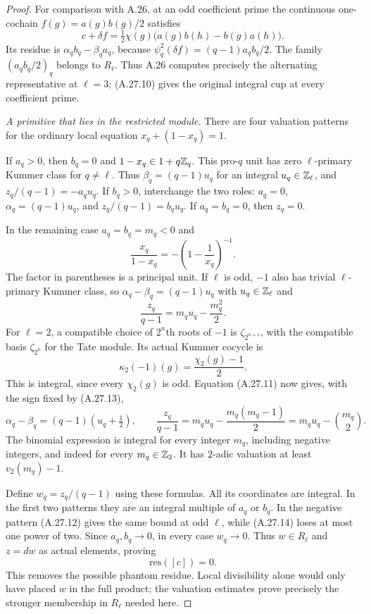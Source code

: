 \begin{proof}
For comparison with A.26, at an odd coefficient prime the
continuous one-cochain $f(g)=a(g)b(g)/2$ satisfies
\[
 c+\delta f
   =\tfrac12\chi(g)\bigl(a(g)b(h)-b(g)a(h)\bigr).
\]
Its residue is $\alpha_qb_q-\beta_qa_q$, because
$\psi_q^2(\delta f)=(q-1)a_qb_q/2$.
The family $(a_qb_q/2)_q$ belongs to $R_\ell$.
Thus A.26 computes precisely the alternating representative
at $\ell=3$; (A.27.10) gives the original integral cup at
every coefficient prime.

\emph{A primitive that lies in the restricted module.}
There are four valuation patterns for the ordinary local
equation $x_q+(1-x_q)=1$.

If $a_q>0$, then $b_q=0$ and $1-x_q\in1+q\mathbb Z_q$.
This pro-$q$ unit has zero $\ell$-primary Kummer class for
$q\ne\ell$. Thus $\beta_q=(q-1)u_q$ for an integral
$u_q\in\mathbb Z_\ell$, and
$z_q/(q-1)=-a_qu_q$.
If $b_q>0$, interchange the two roles: $a_q=0$,
$\alpha_q=(q-1)u_q$, and $z_q/(q-1)=b_qu_q$.
If $a_q=b_q=0$, then $z_q=0$.

In the remaining case $a_q=b_q=m_q<0$ and
\[
 \frac{x_q}{1-x_q}=-\left(1-\frac1{x_q}\right)^{-1}.
 \tag{A.27.11}
\]
The factor in parentheses is a principal unit. If $\ell$ is
odd, $-1$ also has trivial $\ell$-primary Kummer class, so
$\alpha_q-\beta_q=(q-1)u_q$ with $u_q\in\mathbb Z_\ell$ and
\[
 \frac{z_q}{q-1}=m_qu_q-\frac{m_q^2}{2}.
 \tag{A.27.12}
\]
For $\ell=2$, a compatible choice of $2^n$th roots of
$-1$ is $\zeta_{2^{n+1}}$, with the compatible basis
$\zeta_{2^n}$ for the Tate module. Its actual Kummer
cocycle is
\[
             \kappa_2(-1)(g)=\frac{\chi_2(g)-1}{2}.
 \tag{A.27.13}
\]
This is integral, since every $\chi_2(g)$ is odd.
Equation (A.27.11) now gives, with the sign fixed by
(A.27.13),
\[
 \alpha_q-\beta_q=(q-1)\left(u_q+\tfrac12\right),
 \qquad
 \frac{z_q}{q-1}=m_qu_q-\frac{m_q(m_q-1)}2
                =m_qu_q-\binom{m_q}{2}.
 \tag{A.27.14}
\]
The binomial expression is integral for every integer $m_q$,
including negative integers, and indeed for every $m_q\in\mathbb Z_2$.
It has $2$-adic valuation at least $v_2(m_q)-1$.

Define $w_q=z_q/(q-1)$ using these formulas. All its
coordinates are integral. In the first two patterns they
are an integral multiple of $a_q$ or $b_q$. In the
negative pattern (A.27.12) gives the same bound at odd
$\ell$, while (A.27.14) loses at most one power of two.
Since $a_q,b_q\to0$, in every case $w_q\to0$.
Thus $w\in R_\ell$ and $z=dw$ as actual elements, proving
\[
                         \mathrm{res}([c])=0.
 \tag{A.27.15}
\]
This removes the possible phantom residue. Local divisibility
alone would only have placed $w$ in the full product;
the valuation estimates prove precisely the stronger
membership in $R_\ell$ needed here.


\end{proof}
